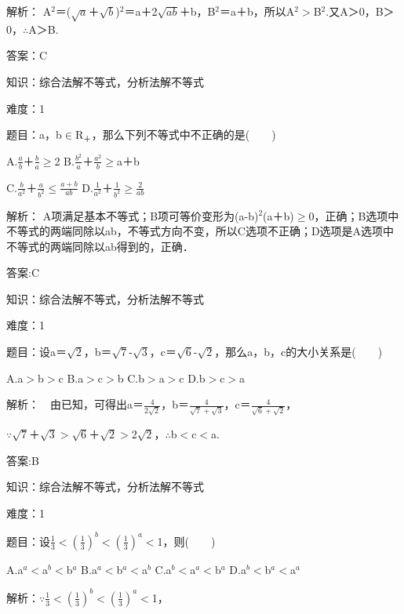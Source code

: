 \documentclass{article} %
\begin{document}
 解析： A${}^{2}$＝($\sqrt{a}$＋$\sqrt{b}$)${}^{2}$＝a＋2$\sqrt{ab}$＋b，B${}^{2}$＝a＋b，所以A${}^{2}$$\mathrm{>}$B${}^{2}$.又A＞0，B＞0，$\mathrm{\therefore}$A＞B.

 答案：C



 知识：综合法解不等式，分析法解不等式

 难度：1

 题目：a，b$\mathrm{\in}$R${}_{\textrm{＋}}$，那么下列不等式中不正确的是(　　)

A.$\frac{a}{b}$＋$\frac{b}{a}$$\mathrm{\ge}$2  B.$\frac{b^2}{a}$＋$\frac{a^2}{b}$$\mathrm{\ge}$a＋b

C.$\frac{b}{a^2}$＋$\frac{a}{b^2}$$\mathrm{\le}$$\frac{a+b}{ab}$  D.$\frac{1}{a^2}$＋$\frac{1}{b^2}$$\mathrm{\ge}$$\frac{2}{ab}$

 解析： A项满足基本不等式；B项可等价变形为(a-b)${}^{2}$(a＋b)$\mathrm{\ge}$0，正确；B选项中不等式的两端同除以ab，不等式方向不变，所以C选项不正确；D选项是A选项中不等式的两端同除以ab得到的，正确．

 答案:C



 知识：综合法解不等式，分析法解不等式

 难度：1

 题目：设a＝$\sqrt{2}$，b＝$\sqrt{7}$-$\sqrt{3}$，c＝$\sqrt{6}$-$\sqrt{2}$，那么a，b，c的大小关系是(　　)

A.a$\mathrm{>}$b$\mathrm{>}$c  B.a$\mathrm{>}$c$\mathrm{>}$b  C.b$\mathrm{>}$a$\mathrm{>}$c  D.b$\mathrm{>}$c$\mathrm{>}$a

 解析：　由已知，可得出a＝$\frac{4}{2\sqrt{2}}$，b＝$\frac{4}{\sqrt{7}+\sqrt{3}}$，c＝$\frac{4}{\sqrt{6}+\sqrt{2}}$，

$\mathrm{\because}$$\sqrt{7}$＋$\sqrt{3}$$\mathrm{>}$$\sqrt{6}$＋$\sqrt{2}$$\mathrm{>}$2$\sqrt{2}$，$\mathrm{\therefore}$b$\mathrm{<}$c$\mathrm{<}$a.

 答案:B



 知识：综合法解不等式，分析法解不等式

 难度：1

 题目：设$\frac{1}{3}\mathrm{<}$$(\frac{1}{3})^b$$\mathrm{<}$$(\frac{1}{3})^a$$\mathrm{<}$1，则(　　)

A.a${}^{a}$$\mathrm{<}$a${}^{b}$$\mathrm{<}$b${}^{a}$  B.a${}^{a}$$\mathrm{<}$b${}^{a}$$\mathrm{<}$a${}^{b}$  C.a${}^{b}$$\mathrm{<}$a${}^{a}$$\mathrm{<}$b${}^{a}$  D.a${}^{b}$$\mathrm{<}$b${}^{a}$$\mathrm{<}$a${}^{a}$

 解析：$\mathrm{\because}$$\frac{1}{3}\mathrm{<}$$(\frac{1}{3})^b$$\mathrm{<}$$(\frac{1}{3})^a$$\mathrm{<}$1，
\end{document}
